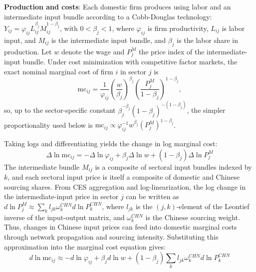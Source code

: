 \documentclass[12pt]{article}
\begin{document}
\textbf{Production and costs}: Each domestic firm produces using labor and an intermediate input bundle according to a Cobb-Douglas technology: $Y_{ij} = \varphi_{ij} L_{ij}^{\beta_j} M_{ij}^{1-\beta_j}$, with $0 < \beta_j < 1$, where $\varphi_{ij}$ is firm productivity, $L_{ij}$ is labor input, and $M_{ij}$ is the intermediate input bundle, and $\beta_j$ is the labor share in production. Let $w$ denote the wage and $P^M_j$ the price index of the intermediate-input bundle. Under cost minimization with competitive factor markets, the exact nominal marginal cost of firm $i$ in sector $j$ is
\[
\text{mc}_{ij}
=
\frac{1}{\varphi_{ij}}
\left( \frac{w}{\beta_j} \right)^{\beta_j}
\left( \frac{P^M_j}{1-\beta_j} \right)^{1-\beta_j},
\]
so, up to the sector-specific constant $\beta_j^{-\beta_j}(1-\beta_j)^{-(1-\beta_j)}$, the simpler proportionality used below is $\text{mc}_{ij} \propto \varphi_{ij}^{-1} w^{\beta_j} (P^M_j)^{1-\beta_j}$.

Taking logs and differentiating yields the change in log marginal cost:
\[\Delta \ln \text{mc}_{ij} = -\Delta \ln \varphi_{ij} + \beta_j \Delta \ln w + (1-\beta_j) \Delta \ln P^M_j\]
The intermediate bundle $M_{ij}$ is a composite of sectoral input bundles indexed by $k$, and each sectoral input price is itself a composite of domestic and Chinese sourcing shares. From CES aggregation and log-linearization, the log change in the intermediate-input price in sector $j$ can be written as $d \ln P^M_{j} \approx \sum_k l_{jk} \omega_k^{CHN} d \ln P^{CHN}_{k}$, where $l_{jk}$ is the $(j,k)$-element of the Leontief inverse of the input-output matrix, and $\omega_k^{CHN}$ is the Chinese sourcing weight. Thus, changes in Chinese input prices can feed into domestic marginal costs through network propagation and sourcing intensity. Substituting this approximation into the marginal cost equation gives: 
\begin{equation}
d \ln \text{mc}_{ij} \approx -d \ln \varphi_{ij} + \beta_j d \ln w + (1-\beta_j) \sum_k l_{jk} \omega_k^{CHN} d \ln P^{CHN}_{k}
\end{equation}
\end{document}
